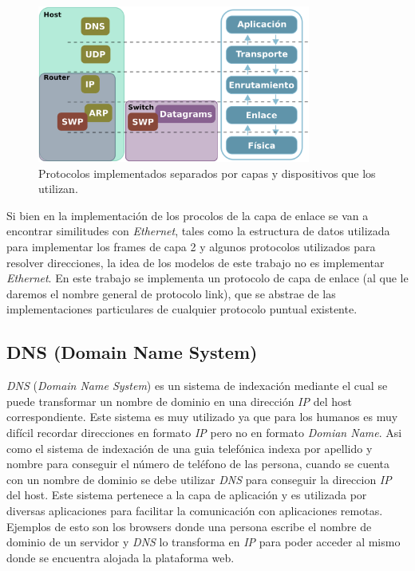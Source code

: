 \documentclass[10pt,a4paper]{article}
\begin{document}
\begin{figure}[!htb]
    \centering
    \includegraphics[width = 0.8\textwidth]{img/png/protocols.png}
    \caption{Protocolos implementados separados por capas y dispositivos que los utilizan.}
    \label{figure: protocolos}
\end{figure}

Si bien en la implementación de los procolos de la capa de enlace se van a encontrar similitudes con \textit{Ethernet}, tales como la estructura de datos utilizada para implementar los frames de capa 2 y algunos protocolos utilizados para resolver direcciones, la idea de los modelos de este trabajo no es implementar \textit{Ethernet}. En este trabajo se implementa un protocolo de capa de enlace (al que le daremos el nombre general de protocolo link), que se abstrae de las implementaciones particulares de cualquier protocolo puntual existente.
	
\subsection{DNS (Domain Name System)}
\textit{DNS} (\textit{Domain Name System}) es un sistema de indexación mediante el cual se puede transformar un nombre de dominio en una dirección \textit{IP} del host correspondiente. Este sistema es muy utilizado ya que para los humanos es muy difícil recordar direcciones en formato \textit{IP} pero no en formato \textit{Domian Name}. Asi como el sistema de indexación de una guia telefónica indexa por apellido y nombre para conseguir el número de teléfono de las persona, cuando se cuenta con un nombre de dominio se debe utilizar \textit{DNS} para conseguir la direccion \textit{IP} del host. Este sistema pertenece a la capa de aplicación y es utilizada por diversas aplicaciones para facilitar la comunicación con aplicaciones remotas. Ejemplos de esto son los browsers donde una persona escribe el nombre de dominio de un servidor y \textit{DNS} lo transforma en \textit{IP} para poder acceder al mismo donde se encuentra alojada la plataforma web. 
\end{document}
